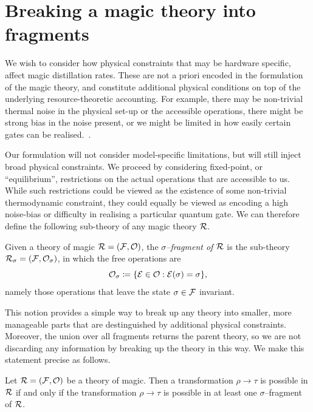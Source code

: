 \documentclass[pra,
aps,
twocolumn,
superscriptaddress,
groupedaddress,
nofootinbib,
reprint
]{revtex4-1}
\begin{document}
\section{Breaking a magic theory into fragments}
We wish to consider how physical constraints that may be hardware specific, affect magic distillation rates. These are not a priori encoded in the formulation of the magic theory, and constitute additional physical conditions on top of the underlying resource-theoretic accounting. For example, there may be non-trivial thermal noise in the physical set-up or the accessible operations, there might be strong bias in the noise present, or we might be limited in how easily certain gates can be realised.~\cite{Litinski_2019, Babbush_2018, Fowler_2019, Li_2015}.

Our formulation will not consider model-specific limitations, but will still inject broad physical constraints. We proceed by considering fixed-point, or ``equilibrium'', restrictions on the actual operations that are accessible to us. While such restrictions could be viewed as the existence of some non-trivial thermodynamic constraint, they could equally be viewed as encoding a high noise-bias or difficulty in realising a particular quantum gate. We can therefore define the following sub-theory of any magic theory $\mathcal{R}$.
\begin{definition}\label{def:sigmafrag}
   Given a theory of magic $\mathcal{R} = (\mathcal{F}, \mathcal{O})$, the \emph{$\sigma$--fragment of $\mathcal{R}$} is the sub-theory $\mathcal{R}_\sigma = (\mathcal{F}, \mathcal{O}_\sigma)$, in which the free operations are 
   \begin{equation}
        \mathcal{O}_\sigma \coloneqq \{ \mathcal{E} \in \mathcal{O}: \mathcal{E}(\sigma) = \sigma \},
    \end{equation}
namely those operations that leave the state $\sigma \in \mathcal{F}$ invariant.
\end{definition}
This notion provides a simple way to break up any theory into smaller, more manageable parts that are destinguished by additional physical constraints. Moreover, the union over all fragments returns the parent theory, so we are not discarding any information by breaking up the theory in this way. We make this statement precise as follows.
\begin{theorem}\label{thm:frag}
    Let $\mathcal{R} = (\mathcal{F}, \mathcal{O})$ be a theory of magic.
Then a transformation $\rho \longrightarrow \tau$ is possible in $\mathcal{R}$ if and only if the transformation $\rho \longrightarrow \tau$ is possible in at least one $\sigma$--fragment of $\mathcal{R}$.
\end{theorem}
\end{document}
